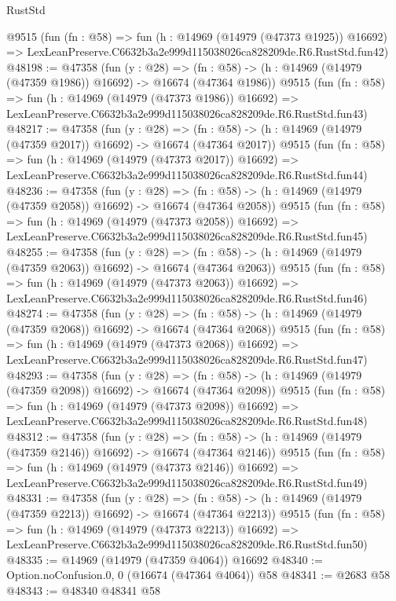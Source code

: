 \begin{lexlean}{RustStd}
\begin{coremodule}
    @9515
    (fun (fn : @58) =>
    fun (h : @14969 (@14979 (@47373 @1925)) @16692) =>
    LexLeanPreserve.C6632b3a2e999d115038026ca828209de.R6.RustStd.fun42)
@48198 := @47358
    (fun (y : @28) =>
    (fn : @58) -> (h : @14969 (@14979 (@47359 @1986)) @16692) -> @16674 (@47364 @1986))
    @9515
    (fun (fn : @58) =>
    fun (h : @14969 (@14979 (@47373 @1986)) @16692) =>
    LexLeanPreserve.C6632b3a2e999d115038026ca828209de.R6.RustStd.fun43)
@48217 := @47358
    (fun (y : @28) =>
    (fn : @58) -> (h : @14969 (@14979 (@47359 @2017)) @16692) -> @16674 (@47364 @2017))
    @9515
    (fun (fn : @58) =>
    fun (h : @14969 (@14979 (@47373 @2017)) @16692) =>
    LexLeanPreserve.C6632b3a2e999d115038026ca828209de.R6.RustStd.fun44)
@48236 := @47358
    (fun (y : @28) =>
    (fn : @58) -> (h : @14969 (@14979 (@47359 @2058)) @16692) -> @16674 (@47364 @2058))
    @9515
    (fun (fn : @58) =>
    fun (h : @14969 (@14979 (@47373 @2058)) @16692) =>
    LexLeanPreserve.C6632b3a2e999d115038026ca828209de.R6.RustStd.fun45)
@48255 := @47358
    (fun (y : @28) =>
    (fn : @58) -> (h : @14969 (@14979 (@47359 @2063)) @16692) -> @16674 (@47364 @2063))
    @9515
    (fun (fn : @58) =>
    fun (h : @14969 (@14979 (@47373 @2063)) @16692) =>
    LexLeanPreserve.C6632b3a2e999d115038026ca828209de.R6.RustStd.fun46)
@48274 := @47358
    (fun (y : @28) =>
    (fn : @58) -> (h : @14969 (@14979 (@47359 @2068)) @16692) -> @16674 (@47364 @2068))
    @9515
    (fun (fn : @58) =>
    fun (h : @14969 (@14979 (@47373 @2068)) @16692) =>
    LexLeanPreserve.C6632b3a2e999d115038026ca828209de.R6.RustStd.fun47)
@48293 := @47358
    (fun (y : @28) =>
    (fn : @58) -> (h : @14969 (@14979 (@47359 @2098)) @16692) -> @16674 (@47364 @2098))
    @9515
    (fun (fn : @58) =>
    fun (h : @14969 (@14979 (@47373 @2098)) @16692) =>
    LexLeanPreserve.C6632b3a2e999d115038026ca828209de.R6.RustStd.fun48)
@48312 := @47358
    (fun (y : @28) =>
    (fn : @58) -> (h : @14969 (@14979 (@47359 @2146)) @16692) -> @16674 (@47364 @2146))
    @9515
    (fun (fn : @58) =>
    fun (h : @14969 (@14979 (@47373 @2146)) @16692) =>
    LexLeanPreserve.C6632b3a2e999d115038026ca828209de.R6.RustStd.fun49)
@48331 := @47358
    (fun (y : @28) =>
    (fn : @58) -> (h : @14969 (@14979 (@47359 @2213)) @16692) -> @16674 (@47364 @2213))
    @9515
    (fun (fn : @58) =>
    fun (h : @14969 (@14979 (@47373 @2213)) @16692) =>
    LexLeanPreserve.C6632b3a2e999d115038026ca828209de.R6.RustStd.fun50)
@48335 := @14969 (@14979 (@47359 @4064)) @16692
@48340 := Option.noConfusion.{0, 0} (@16674 (@47364 @4064)) @58
@48341 := @2683 @58
@48343 := @48340 @48341 @58

\end{coremodule}
\end{lexlean}
